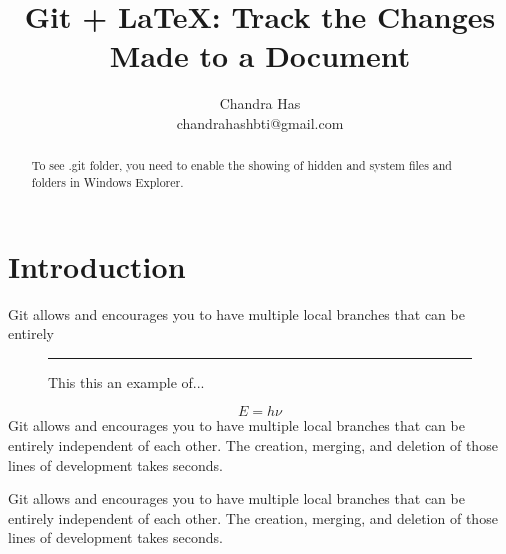\documentclass[a4paper,12pt]{article}
\title{Git + \LaTeX: Track the Changes Made to a Document}
\author{Chandra Has\\ \small chandrahashbti@gmail.com}\date{}
\begin{document}
\maketitle	

\begin{abstract}
To see .git folder, you need to enable the showing of hidden and system files and folders in Windows Explorer.
\end{abstract}

\section{Introduction}
Git allows and encourages you to have multiple local branches that can be entirely 

\begin{figure}[!h]\centering\rule{3cm}{3cm}
	\caption{This this an example of...}
\end{figure}


\begin{equation}E=h\nu\end{equation}
Git allows and encourages you to have multiple local branches that can be entirely independent of each other. The creation, merging, and deletion of those lines of development takes seconds.

Git allows and encourages you to have multiple local branches that can be entirely independent of each other. The creation, merging, and deletion of those lines of development takes seconds.
\end{document}

